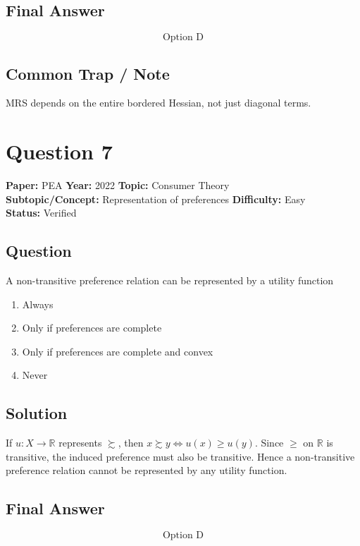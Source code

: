 \documentclass[11pt]{article}
\begin{document}
\subsection*{Final Answer}
\[
\boxed{\text{Option D}}
\]

\subsection*{Common Trap / Note}
MRS depends on the entire bordered Hessian, not just diagonal terms.

\section*{Question 7}
\textbf{Paper:} PEA \quad \textbf{Year:} 2022 \quad \textbf{Topic:} Consumer Theory \\
\textbf{Subtopic/Concept:} Representation of preferences \quad \textbf{Difficulty:} Easy \\
\textbf{Status:} Verified

\subsection*{Question}
A non-transitive preference relation can be represented by a utility function
\begin{enumerate}[label=(\Alph*)]
\item Always
\item Only if preferences are complete
\item Only if preferences are complete and convex
\item Never
\end{enumerate}

\subsection*{Solution}
If $u : X \to \mathbb{R}$ represents $\succsim$, then $x \succsim y \Longleftrightarrow u(x) \geq u(y)$.
Since $\geq$ on $\mathbb{R}$ is transitive, the induced preference must also be transitive.
Hence a non-transitive preference relation cannot be represented by any utility function.

\subsection*{Final Answer}
\[
\boxed{\text{Option D}}
\]
\end{document}
